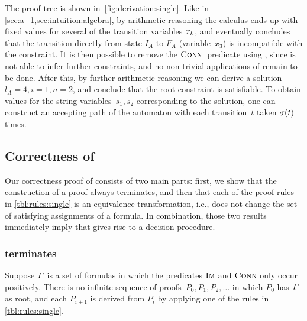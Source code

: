 The proof tree is shown in~\cref{fig:derivation:single}. Like in
\cref{sec:a_1,sec:intuition:algebra}, by arithmetic reasoning the
calculus ends up with fixed values for several of the transition
variables $x_k$, and eventually concludes that the
transition directly from state $I_{A}$ to $F_{A}$ (variable~$x_3$)
is incompatible with
the constraint.  It is then possible to remove the $\operatorname{\textsc{Conn}}{}$
predicate using \Subsume{}, since \Propagate{} is not able to infer
further constraints, and no non-trivial applications of \Split{}
remain to be done.  After this, by further arithmetic reasoning we can
derive a solution~$l_A = 4, i = 1, n = 2$, and conclude that the root
constraint is satisfiable.  To obtain values for the string
variables~$s_1, s_2$ corresponding to the solution, one can
construct an accepting path of the automaton with each transition~$t$
taken $\operatorname{\sigma}(t)$ times.

\iffalse

the rest of the reasoning can be
continued without any part of \Calculus{} since all values of the
existentially quantified transition variables
$\TransitionVar_1,\ldots,\TransitionVar_5$ compatible with
\cref{const:more-inside-than-before,const:s1-in-c-dd,const:s1-substring,const:something-before-and-after}
are represented by the flow equations introduced by $\Expand{}$.
\fi

\subsection{Correctness of \Calculus{}}\label{sec:single:correct}

Our correctness proof of \Calculus{} consists of two main parts: first, we show
that the construction of a proof always terminates, and then that each of the
proof rules in \cref{tbl:rules:single} is an equivalence transformation, i.e.,
does not change the set of satisfying assignments of a formula. In combination,
those two results immediately imply that \Calculus{} gives rise to a decision
procedure.

\subsubsection{\Calculus{} terminates}
\begin{lemma}\label{lma:single-terminates}
  Suppose $\varGamma{}$ is a set of formulas in which the predicates
  $\operatorname{\textsc{Im}}$ and $\operatorname{\textsc{Conn}}$ only occur positively. There is no
  infinite sequence of proofs~$P_0, P_1, P_2, \ldots$ in which $P_0$
  has $\varGamma{}$ as root, and each $P_{i+1}$ is derived from
  $P_i$ by applying one of the rules in \cref{tbl:rules:single}.
\end{lemma}

